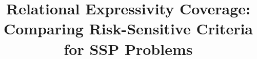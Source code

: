 \documentclass[runningheads]{llncs}
\begin{document}
%
\title{
    Relational Expressivity Coverage: Comparing Risk-Sensitive Criteria for SSP Problems
}
%
%
%
%
%
\maketitle              %
%
\end{document}
